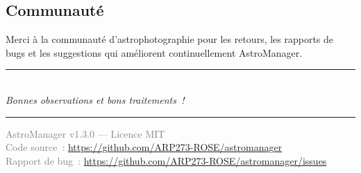 \documentclass[a4paper,11pt]{article}
\begin{document}
\subsection{Communaut\'{e}}

Merci \`{a} la communaut\'{e} d'astrophotographie pour les retours, les rapports de bugs et les suggestions qui am\'{e}liorent continuellement AstroManager.

\vspace{1cm}

\begin{center}
\textcolor{mainblue}{\rule{8cm}{0.8pt}}\\[0.5cm]
{\large\textcolor{mainblue}{\textit{Bonnes observations et bons traitements~!}}}\\[0.3cm]
\textcolor{mainblue}{\rule{8cm}{0.8pt}}
\end{center}

\vfill

\begin{center}
\small\textcolor{gray}{
AstroManager v1.3.0 --- Licence MIT\\
Code source~: \url{https://github.com/ARP273-ROSE/astromanager}\\
Rapport de bug~: \url{https://github.com/ARP273-ROSE/astromanager/issues}
}
\end{center}
\end{document}
